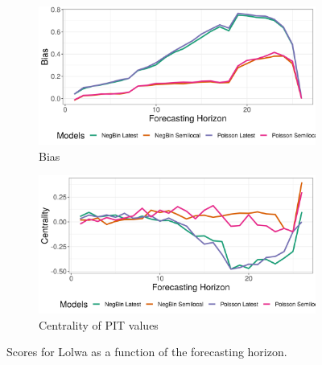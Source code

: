 \begin{figure}[H]
\begin{subfigure}{0.5\textwidth}
  \centering
  \includegraphics[width=\linewidth]{../output/Lolwa_bias.png}  
  \caption{Bias}
  \label{fig:Lolwa_scores_3}
\end{subfigure}
\begin{subfigure}{0.5\textwidth}
  \centering
  \includegraphics[width=\linewidth]{../output/Lolwa_centrality.png}  
  \caption{Centrality of PIT values}
  \label{fig:Lolwa_scores_4}
\end{subfigure}
  \caption{Scores for Lolwa as a function of the forecasting horizon.}

  \label{fig:nat_scores}
\end{figure}
